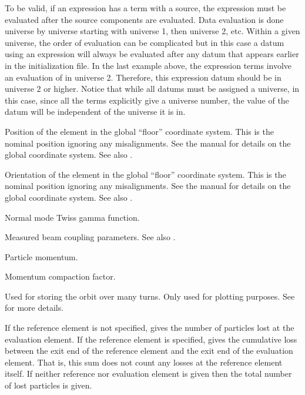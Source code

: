 \begin{description}
{To be valid, if an expression has a term with a  source, the
expression must be evaluated after the  source components are
evaluated. Data evaluation is done universe by universe starting with
universe 1, then universe 2, etc. Within a given universe, the order
of evaluation can be complicated but in this case a datum using an
expression will always be evaluated after any datum that appears
earlier in the initialization file.  In the last example above, the
expression terms involve an evaluation of  in universe 2.  
Therefore, this expression datum should
be in universe 2 or higher. Notice that while all datums must be
assigned a universe, in this case, since all the terms explicitly give
a universe number, the value of the datum will be independent of the
universe it is in.

  \item[floor.x, .y, .z] \Newline
Position of the element in the global ``floor'' coordinate system. This is the nominal
position ignoring any misalignments. See the \bmad manual for details on the global
coordinate system. See also .

  \item[floor.theta, .phi, .psi] \Newline
Orientation of the element in the global ``floor'' coordinate system. This is the nominal
position ignoring any misalignments. See the \bmad manual for details on the global
coordinate system. See also .

  \item[gamma.a, .b] \Newline
Normal mode Twiss gamma function.

  \item[k.11b, .12a, .12b, .22a] \Newline
Measured beam coupling parameters. See also .

  \item[momentum] \Newline
Particle momentum.

  \item[momentum_compaction] \Newline
Momentum compaction factor.

  \item[multi_turn_orbit.x, .y, .z, .px, .py, .pz] \Newline
Used for storing the orbit over many turns. Only used for plotting purposes.
See  for more details.

  \item[n_particle_loss] \Newline
If the reference element is not specified,  gives
the number of particles lost at the evaluation element. If the
reference element is specified,  gives the
cumulative loss between the exit end of the reference element and the
exit end of the evaluation element. That is, this sum does not count
any losses at the reference element itself. If neither reference nor
evaluation element is given then the total number of lost particles is
given.

}
\end{description}
